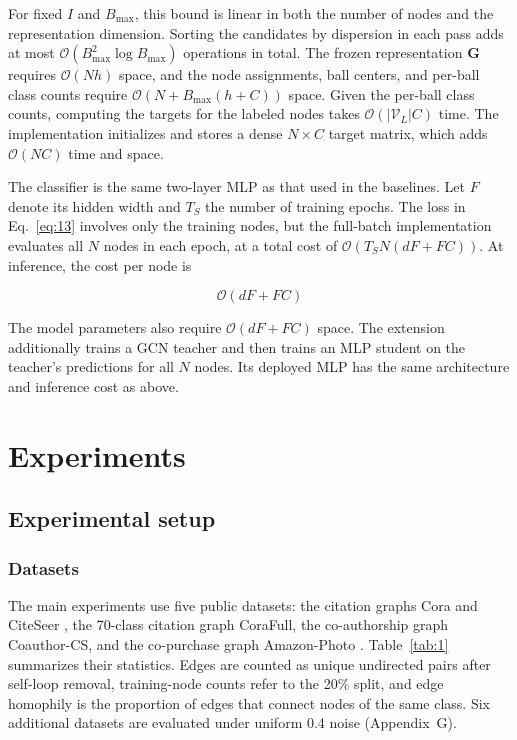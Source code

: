 \documentclass[10pt,letterpaper,nopreprintline]{elsarticle}
\theoremstyle{definition}
\theoremstyle{plain}
\begin{document}
For fixed \(I\) and \(B_{\max}\), this bound is linear in both the number of nodes and the representation dimension. Sorting the candidates by dispersion in each pass adds at most \(\mathcal{O}(B_{\max}^{2}\log B_{\max})\) operations in total. The frozen representation \(\mathbf G\) requires \(\mathcal{O}(Nh)\) space, and the node assignments, ball centers, and per-ball class counts require \(\mathcal{O}(N + B_{\max}(h + C))\) space. Given the per-ball class counts, computing the targets for the labeled nodes takes \(\mathcal{O}(|\mathcal{V}_{L}|C)\) time. The implementation initializes and stores a dense \(N \times C\) target matrix, which adds \(\mathcal{O}(NC)\) time and space.

\Needspace{64pt}

The classifier is the same two-layer MLP as that used in the baselines. Let \(F\) denote its hidden width and \(T_{S}\) the number of training epochs. The loss in Eq.~\eqref{eq:13} involves only the training nodes, but the full-batch implementation evaluates all \(N\) nodes in each epoch, at a total cost of \(\mathcal{O}(T_{S}N(dF + FC))\). At inference, the cost per node is

\begin{equation}\label{eq:23}
\mathcal{O}(dF + FC)
\end{equation}

The model parameters also require \(\mathcal{O}(dF + FC)\) space. The extension additionally trains a GCN teacher and then trains an MLP student on the teacher's predictions for all \(N\) nodes. Its deployed MLP has the same architecture and inference cost as above.

\FloatBarrier

\section{Experiments}\label{sec:4}

\subsection{Experimental setup}\label{sec:4.1}

\subsubsection{Datasets}\label{sec:4.1.1}

The main experiments use five public datasets: the citation graphs Cora and CiteSeer \cite{ref69}, the 70-class citation graph CoraFull, the co-authorship graph Coauthor-CS, and the co-purchase graph Amazon-Photo \cite{ref70}. Table~\ref{tab:1} summarizes their statistics. Edges are counted as unique undirected pairs after self-loop removal, training-node counts refer to the 20\% split, and edge homophily is the proportion of edges that connect nodes of the same class. Six additional datasets are evaluated under uniform 0.4 noise (Appendix~G).
\end{document}
